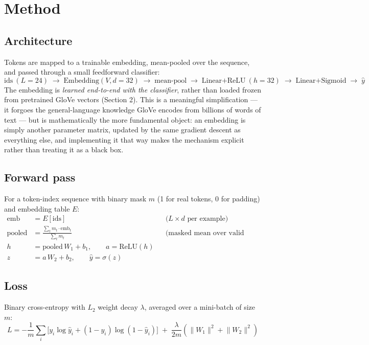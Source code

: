 \documentclass[12pt]{article}
\begin{document}
\section{Method}

\subsection{Architecture}
Tokens are mapped to a trainable embedding, mean-pooled over the sequence, and passed through a small feedforward classifier:
\[
\text{ids}\ (L{=}24) \;\to\; \text{Embedding}(V,d{=}32) \;\to\; \text{mean-pool} \;\to\; \text{Linear+ReLU}\ (h{=}32) \;\to\; \text{Linear+Sigmoid} \;\to\; \hat y
\]
The embedding is \emph{learned end-to-end with the classifier}, rather than loaded frozen from pretrained GloVe vectors (Section 2). This is a meaningful simplification --- it forgoes the general-language knowledge GloVe encodes from billions of words of text --- but is mathematically the more fundamental object: an embedding is simply another parameter matrix, updated by the same gradient descent as everything else, and implementing it that way makes the mechanism explicit rather than treating it as a black box.

\subsection{Forward pass}
For a token-index sequence with binary mask $m$ (1 for real tokens, 0 for padding) and embedding table $E$:
\begin{align*}
\text{emb} &= E[\text{ids}] &&\text{(}L \times d\text{ per example)}\\
\text{pooled} &= \frac{\sum_t m_t \cdot \text{emb}_t}{\sum_t m_t} &&\text{(masked mean over valid tokens)}\\
h &= \text{pooled}\,W_1 + b_1, \qquad a = \mathrm{ReLU}(h)\\
z &= a\,W_2 + b_2, \qquad \hat y = \sigma(z)
\end{align*}

\subsection{Loss}
Binary cross-entropy with $L_2$ weight decay $\lambda$, averaged over a mini-batch of size $m$:
\[
L = -\frac{1}{m}\sum_i \Big[y_i \log \hat y_i + (1-y_i)\log(1-\hat y_i)\Big] \;+\; \frac{\lambda}{2m}\left(\lVert W_1\rVert^2 + \lVert W_2\rVert^2\right)
\]
\end{document}
